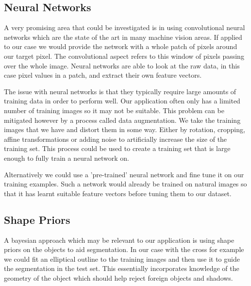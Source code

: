 \documentclass[12pt]{IIBproject}
\begin{document}
\subsection{Neural Networks}
A very promising area that could be investigated is in using convolutional neural networks which are the state of the art in many machine vision areas\cite{imageNet}. If applied to our case we would provide the network with a whole patch of pixels around our target pixel. The convolutional aspect refers to this window of pixels passing over the whole image. Neural networks are able to look at the raw data, in this case pixel values in a patch, and extract their own feature vectors. 

The issue with neural networks is that they typically require large amounts of training data in order to perform well. Our application often only has a limited number of training images so it may not be suitable. This problem can be mitigated however by a process called data augmentation. We take the training images that we have and distort them in some way. Either by rotation, cropping, affine transformations or adding noise to artificially increase the size of the training set. This process could be used to create a training set that is large enough to fully train a neural network on.

 Alternatively we could use a 'pre-trained' neural network and fine tune it on our training examples. Such a network would already be trained on natural images so that it has learnt suitable feature vectors before tuning them to our dataset.
\subsection{Shape Priors}
A bayesian approach which may be relevant to our application is using shape priors on the objects to aid segmentation\cite{chang2008bayesian}. In our case with the cross for example we could fit an elliptical outline to the training images and then use it to guide the segmentation in the test set. This essentially incorporates knowledge of the geometry of the object which should help reject foreign objects and shadows. 

\newpage

\end{document}
